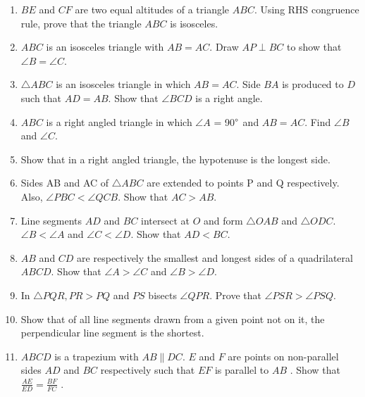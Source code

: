 \begin{enumerate}[label=\arabic*.,ref=\thesubsection.\theenumi]
\item  $BE$ and $CF$ are two equal altitudes of a triangle $ABC$. Using RHS congruence rule, prove that the triangle $ABC$ is isosceles.
\item  $ABC$ is an isosceles triangle with $AB = AC$. Draw $AP \perp BC$ to show that $\angle  B = \angle  C$.
%
\item $\triangle ABC$ is an isosceles triangle in which $AB = AC$. Side $BA$ is produced to $D$ such that $AD = AB$. Show that $\angle BCD$ is a right angle.
%
\item $ABC$ is a right angled triangle in which $\angle A$ = 90$\degree$ and $AB = AC$. Find $\angle B$ and $\angle C$.
%
\item Show that in a right angled triangle, the hypotenuse is the longest side.
\item Sides AB and AC of $\triangle  ABC$ are extended to points P and Q respectively. Also, $\angle  PBC < \angle  QCB$. Show that $AC > AB$.

\item Line segments $AD$ and $BC$ intersect at $O$ and form $\triangle OAB$ and $\triangle ODC$. $\angle  B < \angle  A$ and $\angle  C < \angle  D$. Show that $AD < BC$.

\item $AB$ and $CD$ are respectively the smallest and longest sides of a quadrilateral $ABCD$. Show that $\angle  A > \angle  C$ and $\angle  B > \angle  D$.
%
\item In $\triangle PQR,  PR > PQ$ and $PS$ bisects $\angle  QPR$. Prove that $\angle  PSR > \angle  PSQ$.
%

\item Show that of all line segments drawn from a given point not on it, the perpendicular line segment is the shortest.
%
\item $ABCD$ is a trapezium with $AB  \parallel  DC$. $E$ and $F$ are points on non-parallel sides $AD$ and $BC$ respectively such that $EF$ is parallel to $AB$
. Show that
$\frac{AE}{ED}=\frac{ BF}{  FC}$ .

\end{enumerate}
